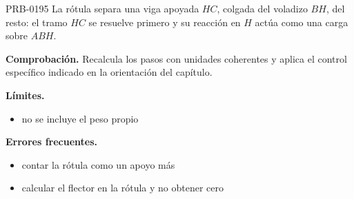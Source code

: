 \begin{studiumworked}{PRB-0195}
La rótula separa una viga apoyada $HC$, colgada del voladizo $BH$, del resto: el tramo $HC$ se resuelve primero y su reacción en $H$ actúa como una carga sobre $ABH$.

\par\textbf{Comprobación.} Recalcula los pasos con unidades coherentes y aplica el control específico indicado en la orientación del capítulo.

\textbf{Límites.}\begin{itemize}\item no se incluye el peso propio\end{itemize}

\textbf{Errores frecuentes.}\begin{itemize}\item contar la rótula como un apoyo más
\item calcular el flector en la rótula y no obtener cero\end{itemize}

\end{studiumworked}

\Needspace{.3\textheight}

